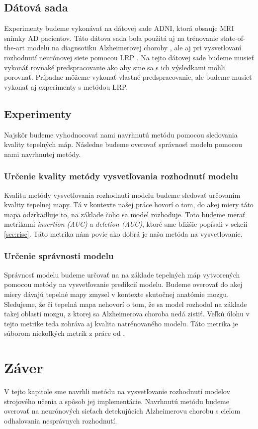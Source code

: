 \subsection{Dátová sada} Experimenty budeme vykonávať na dátovej sade ADNI, ktorá obsauje MRI snímky AD pacientov. Táto dátova sada bola použitá aj na trénovanie state-of-the-art modelu na diagnsotiku Alzheimerovej choroby \cite{esmaeilzadeh2018end}, ale aj pri vysvetlovaní rozhodnutí neurónovej siete pomocou LRP \cite{bohle2019layer}. Na tejto dátovej sade budeme musieť vykonáť rovnaké predspracovanie ako \citeauthor*{bohle2019layer} aby sme sa s ich výsledkami mohli porovnať. Prípadne môžeme vykonať vlastné predspracovanie, ale budeme musieť vykonať aj experimenty s metódou LRP.

\subsection{Experimenty}

Najskôr budeme vyhodnocovať nami navrhnutú metódu pomocou sledovania kvality tepelných máp. Následne budeme overovať správnosť modelu pomocou nami navrhnutej metódy.

\subsubsection{Určenie kvality metódy vysvetľovania rozhodnutí modelu}

Kvalitu metódy vysvetľovania rozhodnutí modelu budeme sledovať určovaním kvality tepelnej mapy. Tá v kontexte našej práce hovorí o tom, do akej miery táto mapa odzrkadluje to, na základe čoho sa model rozhoduje. Toto budeme merať metrikami \textit{insertion (AUC)} a \textit{deletion (AUC)}, ktoré sme bližšie popísali v sekcii \ref{sec:rise}. Táto metrika nám povie ako dobrá je naša metóda na vysvetlovanie.

\subsubsection{Určenie správnosti modelu}

Správnosť modelu budeme určovať na na základe tepelných máp vytvorených pomocou metódy na vysvetľovanie predikcií modelu. Budeme overovať do akej miery dávajú tepelné mapy zmysel v kontexte skutočnej anatómie mozgu. Sledujeme, že či tepelná mapa nehovorí o tom, že sa model rozhodol na základe takej oblasti mozgu, z ktorej sa Alzheimerova choroba nedá zistiť. Veľkú úlohu v tejto metrike teda zohráva aj kvalita natrénovaného modelu. Táto metrika je súborom niekoľkých metrík z práce od \citeauthor*{bohle2019layer}.


\section{Záver}

V tejto kapitole sme navrhli metódu na vysvetľovanie rozhodnutí modelov strojového učenia a spôsob jej implementácie. Navrhnutú metódu budeme overovať na neurónových sieťach detekujúcich Alzheimerovu chorobu s cieľom odhalovania nesprávnych rozhodnutí.
